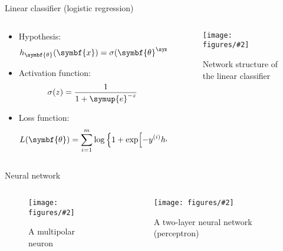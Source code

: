 \documentclass[aspectratio=169]{beamer}
\def\ee{{\symup{e}}}
\def\trans{{\symup{T}}}
\def\bm#1{{\symbf{#1}}}
\newcommand\imageinput[2][]{\texttt{[image: figures/\#2]}}
\begin{document}
\begin{frame}{Linear classifier (logistic regression)}
\begin{columns}[t]
  \begin{column}{0.52\textwidth}
    \begin{itemize}
      \item Hypothesis:
        \[ h_\bm{\theta} (\bm{x}) = \sigma(\bm{\theta}^\trans \bm{x}) \]
      \item Activation function:
        \[ \sigma(z) = \frac{1}{1+\ee^{-z}} \]
      \item Loss function:
        \[
          L(\bm{\theta})
          = \sum_{i=1}^m \log\qty\Big{1+\exp[-y^{(i)} h_\bm{\theta}\qty\big(\bm{x}^{(i)})]}
        \]
    \end{itemize}
  \end{column}
  \begin{column}{0.44\textwidth}
    \begin{figure}
      \centering
      \imageinput[width=0.9\textwidth]{linear-layer.pdf}
      \caption{Network structure of the linear classifier}
    \end{figure}
  \end{column}
\end{columns}
\end{frame}

\begin{frame}{Neural network}
\begin{columns}[t]
  \begin{column}{0.44\textwidth}
    \begin{figure}
      \centering
      \imageinput[height=3.8cm]{multipolar-neuron.png}
      \caption{A multipolar neuron \footnotemark}
    \end{figure}
  \end{column}
  \begin{column}{0.54\textwidth}
    \begin{figure}
      \centering
      \imageinput[height=3.8cm]{neural-net.pdf}
      \caption{A two-layer neural network (perceptron)}
    \end{figure}
  \end{column}
\end{columns}
\end{frame}
\end{document}
